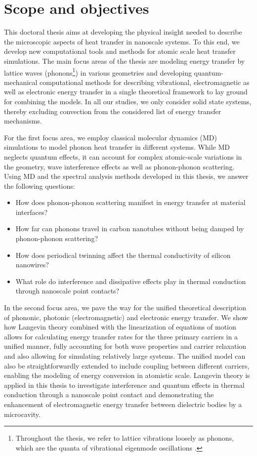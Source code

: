 \section{Scope and objectives}

This doctoral thesis aims at developing the physical insight needed to describe the microscopic aspects of heat transfer in nanoscale systems. To this end, we develop new computational tools and methods for atomic scale heat transfer simulations. The main focus areas of the thesis are modeling energy transfer by lattice waves (phonons\footnote{Throughout the thesis, we refer to lattice vibrations loosely as phonons, which are the quanta of vibrational eigenmode oscillations \cite{ziman}.}) in various geometries and developing quantum-mechanical computational methods for describing vibrational, electromagnetic as well as electronic energy transfer in a single theoretical framework to lay ground for combining the models. In all our studies, we only consider solid state systems, thereby excluding convection \cite{chen} from the considered list of energy transfer mechanisms. 

For the first focus area, we employ classical molecular dynamics (MD) simulations to model phonon heat transfer in different systems. While MD neglects quantum effects, it can account for complex atomic-scale variations in the geometry, wave interference effects as well as phonon-phonon scattering. Using MD and the spectral analysis methods developed in this thesis, we answer the following questions: 
 \begin{itemize}
  \item How does phonon-phonon scattering manifest in energy transfer at material interfaces?
  \item How far can phonons travel in carbon nanotubes without being damped by phonon-phonon scattering?
  \item How does periodical twinning affect the thermal conductivity of silicon nanowires?
  \item What role do interference and dissipative effects play in thermal conduction through nanoscale point contacts?
 \end{itemize}

In the second focus area, we pave the way for the unified theoretical description of phononic, photonic (electromagnetic) and electronic energy transfer. We show how Langevin theory \cite{langevin08,zwanzig} combined with the linearization of equations of motion allows for calculating energy transfer rates for the three primary carriers in a unified manner, fully accounting for both wave properties and carrier relaxation and also allowing for simulating relatively large systems. The unified model can also be straightforwardly extended to include coupling between different carriers, enabling the modeling of energy conversion in atomistic scale. Langevin theory is applied in this thesis to investigate interference and quantum effects in thermal conduction through a nanoscale point contact and demonstrating the enhancement of electromagnetic energy transfer between dielectric bodies by a microcavity.

